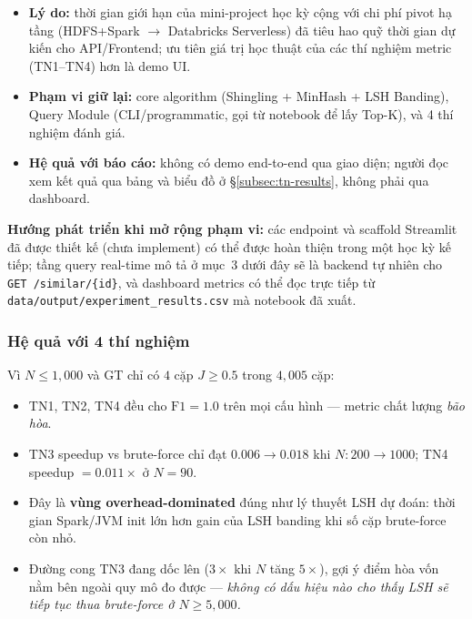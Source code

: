 \begin{itemize}
    \item \textbf{Lý do:} thời gian giới hạn của mini-project học kỳ cộng với chi phí pivot hạ tầng (HDFS+Spark $\rightarrow$ Databricks Serverless) đã tiêu hao quỹ thời gian dự kiến cho API/Frontend; ưu tiên giá trị học thuật của các thí nghiệm metric (TN1--TN4) hơn là demo UI.
    \item \textbf{Phạm vi giữ lại:} core algorithm (Shingling + MinHash + LSH Banding), Query Module (CLI/programmatic, gọi từ notebook để lấy Top-K), và 4 thí nghiệm đánh giá.
    \item \textbf{Hệ quả với báo cáo:} không có demo end-to-end qua giao diện; người đọc xem kết quả qua bảng và biểu đồ ở \S\ref{subsec:tn-results}, không phải qua dashboard.
\end{itemize}

\textbf{Hướng phát triển khi mở rộng phạm vi:} các endpoint và scaffold Streamlit đã được thiết kế (chưa implement) có thể được hoàn thiện trong một học kỳ kế tiếp; tầng query real-time mô tả ở mục~3 dưới đây sẽ là backend tự nhiên cho \texttt{GET /similar/\{id\}}, và dashboard metrics có thể đọc trực tiếp từ \texttt{data/output/experiment\_results.csv} mà notebook đã xuất.

\subsubsection{Hệ quả với 4 thí nghiệm}

Vì $N \leq 1{,}000$ và GT chỉ có $4$ cặp $J \geq 0.5$ trong $4{,}005$ cặp:

\begin{itemize}
    \item TN1, TN2, TN4 đều cho $\text{F1} = 1.0$ trên mọi cấu hình --- metric chất lượng \emph{bão hòa}.
    \item TN3 speedup vs brute-force chỉ đạt $0.006 \rightarrow 0.018$ khi $N: 200 \rightarrow 1000$; TN4 speedup $= 0.011\times$ ở $N = 90$.
    \item Đây là \textbf{vùng overhead-dominated} đúng như lý thuyết LSH dự đoán: thời gian Spark/JVM init lớn hơn gain của LSH banding khi số cặp brute-force còn nhỏ.
    \item Đường cong TN3 đang dốc lên ($3\times$ khi $N$ tăng $5\times$), gợi ý điểm hòa vốn nằm bên ngoài quy mô đo được --- \emph{không có dấu hiệu nào cho thấy LSH sẽ tiếp tục thua brute-force ở $N \geq 5{,}000$.}
\end{itemize}

